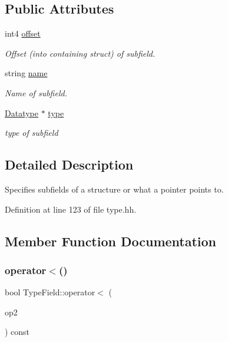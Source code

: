 \subsection*{Public Attributes}
\begin{DoxyCompactItemize}
\item 
int4 \mbox{\hyperlink{struct_type_field_a5b8be5d9b503252bd87ef1038f465ec8}{offset}}
\begin{DoxyCompactList}\small\item\em Offset (into containing struct) of subfield. \end{DoxyCompactList}\item 
string \mbox{\hyperlink{struct_type_field_a61abd462b68f2dd96a65467121c9901d}{name}}
\begin{DoxyCompactList}\small\item\em Name of subfield. \end{DoxyCompactList}\item 
\mbox{\hyperlink{class_datatype}{Datatype}} $\ast$ \mbox{\hyperlink{struct_type_field_a6d0befd0901d67950a1ed085ebdad92c}{type}}
\begin{DoxyCompactList}\small\item\em type of subfield \end{DoxyCompactList}\end{DoxyCompactItemize}


\subsection{Detailed Description}
Specifies subfields of a structure or what a pointer points to. 

Definition at line 123 of file type.\+hh.



\subsection{Member Function Documentation}
\mbox{\label{struct_type_field_a4680ac4ecd0d45094984c96e90054d05}} 
\subsubsection{\texorpdfstring{operator$<$()}{operator<()}}
{\footnotesize\ttfamily bool Type\+Field\+::operator$<$ (\begin{DoxyParamCaption}\item[{const \mbox{\hyperlink{struct_type_field}{Type\+Field}} \&}]{op2 }\end{DoxyParamCaption}) const\hspace{0.3cm}{\ttfamily [inline]}}



